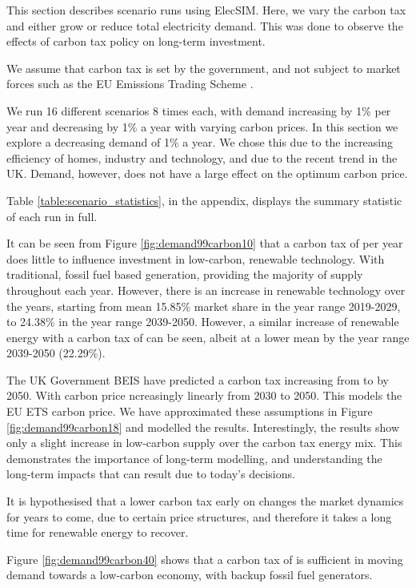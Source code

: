 
This section describes scenario runs using ElecSIM. Here, we vary the carbon tax and either grow or reduce total electricity demand. This was done to observe the effects of carbon tax policy on long-term investment.

We assume that carbon tax is set by the government, and not subject to market forces such as the EU Emissions Trading Scheme \cite{Council2016}.

We run 16 different scenarios 8 times each, with demand increasing by 1\% per year and decreasing by 1\% a year with varying carbon prices. In this section we explore a decreasing demand of 1\% a year. We chose this due to the increasing efficiency of homes, industry and technology, and due to the recent trend in the UK. Demand, however, does not have a large effect on the optimum carbon price.

Table \ref{table:scenario_statistics}, in the appendix, displays the summary statistic of each run in full.

It can be seen from Figure \ref{fig:demand99carbon10} that a carbon tax of  per year does little to influence investment in low-carbon, renewable technology. With traditional, fossil fuel based generation, providing the majority of supply throughout each year. However, there is an increase in renewable technology over the years, starting from mean 15.85\% market share in the year range 2019-2029, to 24.38\% in the year range 2039-2050. However, a similar increase of renewable energy with a carbon tax of  can be seen, albeit at a lower mean by the year range 2039-2050 (22.29\%).

The UK Government BEIS have predicted a carbon tax increasing from  to  by 2050. With carbon price ncreasingly linearly from 2030 to 2050. This models the EU ETS carbon price. We have approximated these assumptions in Figure \ref{fig:demand99carbon18} and modelled the results. Interestingly, the results show only a slight increase in low-carbon supply over the  carbon tax energy mix. This demonstrates the importance of long-term modelling, and understanding the long-term impacts that can result due to today's decisions.

It is hypothesised that a lower carbon tax early on changes the market dynamics for years to come, due to certain price structures, and therefore it takes a long time for renewable energy to recover.

Figure \ref{fig:demand99carbon40} shows that a carbon tax of  is sufficient in moving demand towards a low-carbon economy, with backup fossil fuel generators.

